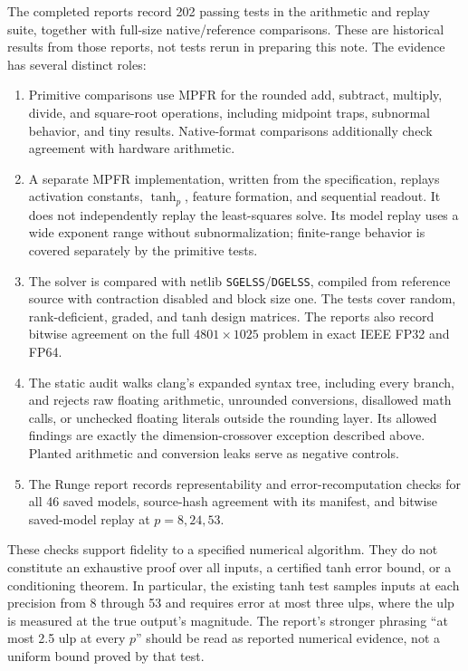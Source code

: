 \documentclass[11pt]{article}
\newcommand{\tp}{\operatorname{tanh}_{p}}
\newcommand{\code}[1]{\texttt{#1}}
\begin{document}
The completed reports record 202 passing tests in the arithmetic and replay
suite, together with full-size native/reference comparisons. These are
historical results from those reports, not tests rerun in preparing this note.
The evidence has several distinct roles:
\begin{enumerate}
\item Primitive comparisons use MPFR for the rounded add, subtract, multiply,
divide, and square-root operations, including midpoint traps, subnormal
behavior, and tiny results. Native-format comparisons additionally check
agreement with hardware arithmetic.
\item A separate MPFR implementation, written from the specification,
replays activation constants, $\tp$, feature formation, and sequential
readout. It does not independently replay the least-squares solve. Its model
replay uses a wide exponent range without subnormalization; finite-range
behavior is covered separately by the primitive tests.
\item The solver is compared with netlib \code{SGELSS}/\code{DGELSS},
compiled from reference source with contraction disabled and block size one.
The tests cover random, rank-deficient, graded, and tanh design matrices.
The reports also record bitwise agreement on the full $4801\times1025$
problem in exact IEEE FP32 and FP64.
\item The static audit walks clang's expanded syntax tree, including every
branch, and rejects raw floating arithmetic, unrounded conversions, disallowed
math calls, or unchecked floating literals outside the rounding layer.
Its allowed findings are exactly the dimension-crossover exception described
above. Planted arithmetic and conversion leaks serve as negative controls.
\item The Runge report records representability and error-recomputation
checks for all 46 saved models, source-hash agreement with its manifest, and
bitwise saved-model replay at $p=8,24,53$.
\end{enumerate}

These checks support fidelity to a specified numerical algorithm. They do not
constitute an exhaustive proof over all inputs, a certified tanh error bound,
or a conditioning theorem. In particular, the existing tanh test samples
inputs at each precision from 8 through 53 and requires error at most three
ulps, where the ulp is measured at the true output's magnitude. The report's
stronger phrasing ``at most 2.5 ulp at every $p$'' should be read as reported
numerical evidence, not a uniform bound proved by that test.
\end{document}
